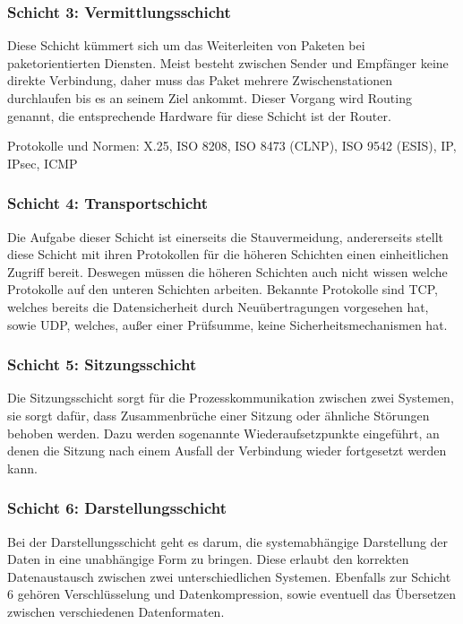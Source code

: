 \documentclass[a4paper,14pt,headsepline]{scrartcl}
\begin{document}
\subsubsection*{Schicht 3: Vermittlungsschicht}
Diese Schicht kümmert sich um das Weiterleiten von Paketen bei paketorientierten Diensten. Meist besteht zwischen Sender und Empfänger keine direkte Verbindung, daher muss das Paket mehrere Zwischenstationen durchlaufen bis es an seinem Ziel ankommt. Dieser Vorgang wird Routing genannt, die entsprechende Hardware für diese Schicht ist der Router.

Protokolle und Normen: X.25, ISO 8208, ISO 8473 (CLNP), ISO 9542 (ESIS), IP, IPsec, ICMP

\subsubsection*{Schicht 4: Transportschicht}
Die Aufgabe dieser Schicht ist einerseits die Stauvermeidung, andererseits stellt diese Schicht mit ihren Protokollen für die höheren Schichten einen einheitlichen Zugriff bereit. Deswegen müssen die höheren Schichten auch nicht wissen welche Protokolle auf den unteren Schichten arbeiten. Bekannte Protokolle sind TCP, welches bereits die Datensicherheit durch Neuübertragungen vorgesehen hat, sowie UDP, welches, außer einer Prüfsumme, keine Sicherheitsmechanismen hat.

\subsubsection*{Schicht 5: Sitzungsschicht}
Die Sitzungsschicht sorgt für die Prozesskommunikation zwischen zwei Systemen, sie sorgt dafür, dass Zusammenbrüche einer Sitzung oder ähnliche Störungen behoben werden. Dazu werden sogenannte Wiederaufsetzpunkte eingeführt, an denen die Sitzung nach einem Ausfall der Verbindung wieder fortgesetzt werden kann.

\subsubsection*{Schicht 6: Darstellungsschicht}
Bei der Darstellungsschicht geht es darum, die systemabhängige Darstellung der Daten in eine unabhängige Form zu bringen. Diese erlaubt den korrekten Datenaustausch zwischen zwei unterschiedlichen Systemen. Ebenfalls zur Schicht 6 gehören Verschlüsselung und Datenkompression, sowie eventuell das Übersetzen zwischen verschiedenen Datenformaten.
\end{document}

